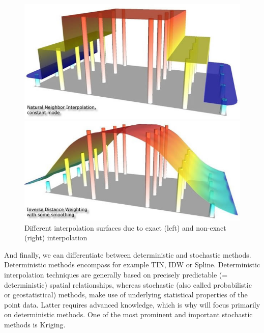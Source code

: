 \begin{figure}
	\begin{minipage}[b]{.48\linewidth}
		\includegraphics[width=\linewidth]{images/exakte_interpolation.jpg}
	\end{minipage}
	\hfill
	\begin{minipage}[b]{.48\linewidth}
		\includegraphics[width=\linewidth]{images/nicht_exakte_interpolation.jpg}
	\end{minipage}
	\caption{Different interpolation surfaces due to exact (left) and non-exact (right) interpolation\cite{gitta_raumliche_2016}}
	\label{fig:exact_non_exact_interploation}
\end{figure}

And finally, we can differentiate between deterministic and stochastic methods.\cite{gitta_raumliche_2016}
Deterministic methods encompass for example \ldq{}TIN\rdq{}, \ldq{}IDW\rdq{} or \ldq{}Spline\rdq{}. \cite{wasser_going_2020} Deterministic interpolation techniques are generally based on precisely predictable (= deterministic) spatial relationships, whereas stochastic (also called probabilistic or geostatistical) methods, make use of underlying statistical properties of the point data. Latter requires advanced knowledge, which is why will focus primarily on deterministic methods. One of the most prominent and important stochastic methods is Kriging.

